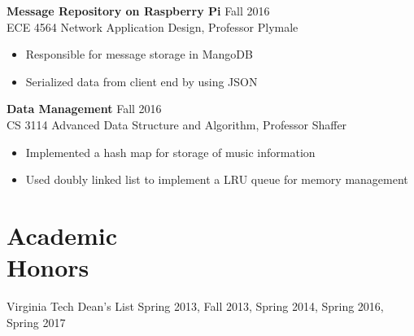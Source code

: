 \documentclass[margin]{res}
\begin{document}
\begin{resume}
\begin{itemize}
		 \end{itemize}

		{\bf  Message Repository on Raspberry Pi}                                     \hfill       Fall 2016 \\
		{ECE 4564 Network Application Design, Professor Plymale}
                \begin{itemize} \itemsep -2pt
                 \item  Responsible for message storage in MangoDB 
                 \item Serialized data from client end by using JSON

		 \end{itemize}

                  {\bf  Data Management}                             \hfill  Fall 2016 \\ 
                  {CS 3114 Advanced Data Structure and Algorithm, Professor Shaffer}  
                  \begin{itemize} \itemsep -2pt
                  \item Implemented a hash map for storage of music information
                  \item Used doubly linked list to implement a LRU queue for memory management
		 \end{itemize}

\section{Academic \\ Honors} 
Virginia Tech Dean's List Spring 2013, Fall 2013, Spring 2014, Spring 2016, Spring 2017
 

\end{resume} 
\end{document}
